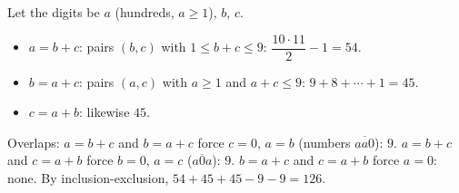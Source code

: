 Let the digits be $a$ (hundreds, $a\ge1$), $b$, $c$.
\begin{itemize}
\item $a=b+c$: pairs $(b,c)$ with $1\le b+c\le9$: $\dfrac{10\cdot11}2-1=54$.
\item $b=a+c$: pairs $(a,c)$ with $a\ge1$ and $a+c\le9$: $9+8+\cdots+1=45$.
\item $c=a+b$: likewise $45$.
\end{itemize}
Overlaps: $a=b+c$ and $b=a+c$ force $c=0$, $a=b$ (numbers $\overline{aa0}$): $9$. $a=b+c$ and $c=a+b$ force $b=0$, $a=c$ ($\overline{a0a}$): $9$. $b=a+c$ and $c=a+b$ force $a=0$: none. By inclusion-exclusion, $54+45+45-9-9=\boxed{126}$.
